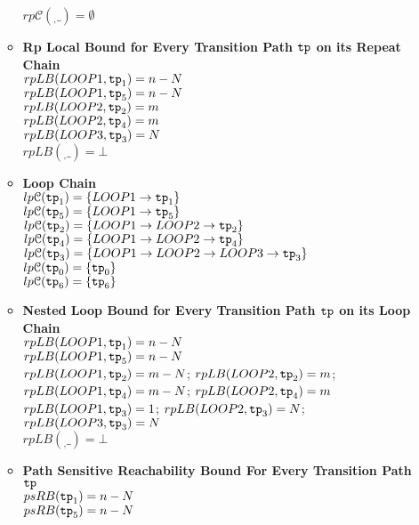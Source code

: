\begin{enumerate}
\begin{itemize}
    $rp\mathcal{C}(_, \_) = \emptyset$ 
    \item \textbf{Rp Local Bound for Every Transition Path $\mathtt{tp}$ on its Repeat Chain}
    \\
    $rpLB(LOOP1, \mathtt{tp}_1) = n - N$ \\
    $rpLB(LOOP1, \mathtt{tp}_5) = n - N$ \\
    $rpLB(LOOP2, \mathtt{tp}_2) = m$ \\
    $rpLB(LOOP2, \mathtt{tp}_4) = m$ \\
    $rpLB(LOOP3, \mathtt{tp}_3) = N$ \\
    $rpLB(_, \_) = \bot $ 
    \item \textbf{Loop Chain}
    \\
    $lp\mathcal{C}(\mathtt{tp}_1) = \{LOOP1\to \mathtt{tp}_1\}$ \\
    $lp\mathcal{C}(\mathtt{tp}_5) = \{LOOP1\to \mathtt{tp}_5\}$ \\
    $lp\mathcal{C}(\mathtt{tp}_2) = \{LOOP1 \to LOOP2 \to \mathtt{tp}_2\}$ \\
    $lp\mathcal{C}(\mathtt{tp}_4) = \{LOOP1 \to LOOP2 \to \mathtt{tp}_4\}$ \\
    $lp\mathcal{C}(\mathtt{tp}_3) = \{LOOP1 \to LOOP2 \to LOOP3 \to \mathtt{tp}_3\}$ \\
    $lp\mathcal{C}(\mathtt{tp}_0) = \{\mathtt{tp}_0\}$ \\
    $lp\mathcal{C}(\mathtt{tp}_6) = \{\mathtt{tp}_6\}$ 
    \item \textbf{Nested Loop Bound for Every Transition Path $\mathtt{tp}$ on its Loop Chain}
    \\
    $rpLB(LOOP1, \mathtt{tp}_1) = n - N$ \\
    $rpLB(LOOP1, \mathtt{tp}_5) = n - N$ \\
    $rpLB(LOOP1, \mathtt{tp}_2) = m - N$;  $rpLB(LOOP2, \mathtt{tp}_2) = m$; \\
    $rpLB(LOOP1, \mathtt{tp}_4) = m - N$; $rpLB(LOOP2, \mathtt{tp}_4) = m$ \\
    $rpLB(LOOP1, \mathtt{tp}_3) = 1$; $rpLB(LOOP2, \mathtt{tp}_3) = N$; $rpLB(LOOP3, \mathtt{tp}_3) = N$ \\
    $rpLB(_, \_) = \bot $ 
    \item \textbf{Path Sensitive Reachability Bound For Every Transition Path $\mathtt{tp}$ }
    \\
    $psRB(\mathtt{tp}_1) = n - N$ \\
    $psRB(\mathtt{tp}_5) = n - N$ \\

\end{itemize}
\end{enumerate}
